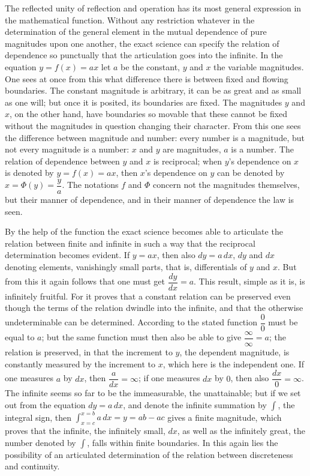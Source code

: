 \documentclass[12pt]{book}
\begin{document}
The reflected unity of reflection and operation has its most general expression in the
mathematical function. Without any restriction whatever in the determination of the
general element in the mutual dependence of pure magnitudes upon one another, the
exact science can specify the relation of dependence so punctually that the
articulation goes into the infinite. In the equation $y = f(x) = ax$ let $a$ be the
constant, $y$ and $x$ the variable magnitudes. One sees at once from this what
difference there is between fixed and flowing boundaries. The constant magnitude is
arbitrary, it can be as great and as small as one will; but once it is posited, its
boundaries are fixed. The magnitudes $y$ and $x$, on the other hand, have boundaries
so movable that these cannot be fixed without the magnitudes in question changing
their character. From this one sees the difference between magnitude and number: every
number is a magnitude, but not every magnitude is a number: $x$ and $y$ are magnitudes,
$a$ is a number. The relation of dependence between $y$ and $x$ is reciprocal; when
$y$'s dependence on $x$ is denoted by $y = f(x) = ax$, then $x$'s dependence on $y$ can
be denoted by $x = \Phi(y) = \dfrac{y}{a}$. The notations $f$ and $\Phi$ concern not
the magnitudes themselves, but their manner of dependence, and in their manner of
dependence the law is seen.

By the help of the function the exact science becomes able to articulate the relation
between finite and infinite in such a way that the reciprocal determination becomes
evident. If $y = ax$, then also $dy = a\,dx$, $dy$ and $dx$ denoting elements,
vanishingly small parts, that is, differentials of $y$ and $x$. But from this it again
follows that one must get $\dfrac{dy}{dx} = a$. This result, simple as it is, is
infinitely fruitful. For it proves that a constant relation can be preserved even
though the terms of the relation dwindle into the infinite, and that the otherwise
undeterminable can be determined. According to the stated function $\dfrac{0}{0}$ must
be equal to $a$; but the same function must then also be able to give
$\dfrac{\infty}{\infty} = a$; the relation is preserved, in that the increment to $y$,
the dependent magnitude, is constantly measured by the increment to $x$, which here is
the independent one. If one measures $a$ by $dx$, then $\dfrac{a}{dx} = \infty$; if one
measures $dx$ by $0$, then also $\dfrac{dx}{0} = \infty$. The infinite seems so far to
be the immeasurable, the unattainable; but if we set out from the equation $dy =
a\,dx$, and denote the infinite summation by $\int$, the integral sign, then
$\int_{x=c}^{x=b} a\,dx = y = ab - ac$ gives a finite magnitude, which proves that the
infinite, the infinitely small, $dx$, as well as the infinitely great, the number
denoted by $\int$, falls within finite boundaries. In this again lies the possibility
of an articulated determination of the relation between discreteness and continuity.
\end{document}
